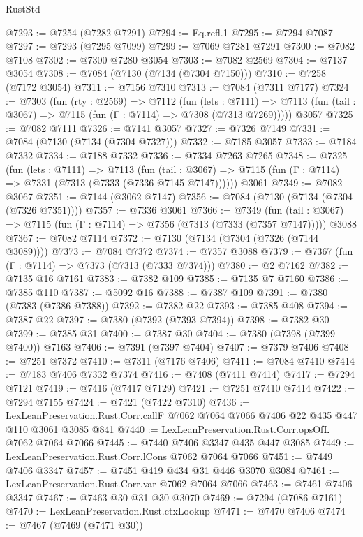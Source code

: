 \begin{lexlean}{RustStd}
\begin{coremodule}
@7293 := @7254 (@7282 @7291)
@7294 := Eq.refl.{1}
@7295 := @7294 @7087
@7297 := @7293 (@7295 @7099)
@7299 := @7069 @7281 @7291
@7300 := @7082 @7108
@7302 := @7300 @7280 @3054
@7303 := @7082 @2569
@7304 := @7137 @3054
@7308 := @7084 (@7130 (@7134 (@7304 @7150)))
@7310 := @7258 (@7172 @3054)
@7311 := @7156 @7310
@7313 := @7084 (@7311 @7177)
@7324 := @7303
    (fun (rty : @2569) =>
    @7112
      (fun (lets : @7111) =>
      @7113 (fun (tail : @3067) => @7115 (fun (Γ : @7114) => @7308 (@7313 @7269)))))
    @3057
@7325 := @7082 @7111
@7326 := @7141 @3057
@7327 := @7326 @7149
@7331 := @7084 (@7130 (@7134 (@7304 @7327)))
@7332 := @7185 @3057
@7333 := @7184 @7332
@7334 := @7188 @7332
@7336 := @7334 @7263 @7265
@7348 := @7325
    (fun (lets : @7111) =>
    @7113
      (fun (tail : @3067) => @7115 (fun (Γ : @7114) => @7331 (@7313 (@7333 (@7336 @7145 @7147))))))
    @3061
@7349 := @7082 @3067
@7351 := @7144 (@3062 @7147)
@7356 := @7084 (@7130 (@7134 (@7304 (@7326 @7351))))
@7357 := @7336 @3061
@7366 := @7349
    (fun (tail : @3067) => @7115 (fun (Γ : @7114) => @7356 (@7313 (@7333 (@7357 @7147)))))
    @3088
@7367 := @7082 @7114
@7372 := @7130 (@7134 (@7304 (@7326 (@7144 @3089))))
@7373 := @7084 @7372
@7374 := @7357 @3088
@7379 := @7367 (fun (Γ : @7114) => @7373 (@7313 (@7333 @7374)))
@7380 := @2 @7162
@7382 := @7135 @16 @7161
@7383 := @7382 @109
@7385 := @7135 @7 @7160
@7386 := @7385 @110
@7387 := @5092 @16
@7388 := @7387 @109
@7391 := @7380 (@7383 (@7386 @7388))
@7392 := @7382 @22
@7393 := @7385 @408
@7394 := @7387 @22
@7397 := @7380 (@7392 (@7393 @7394))
@7398 := @7382 @30
@7399 := @7385 @31
@7400 := @7387 @30
@7404 := @7380 (@7398 (@7399 @7400)) @7163
@7406 := @7391 (@7397 @7404)
@7407 := @7379 @7406
@7408 := @7251 @7372
@7410 := @7311 (@7176 @7406)
@7411 := @7084 @7410
@7414 := @7183 @7406 @7332 @7374
@7416 := @7408 (@7411 @7414)
@7417 := @7294 @7121
@7419 := @7416 (@7417 @7129)
@7421 := @7251 @7410 @7414
@7422 := @7294 @7155
@7424 := @7421 (@7422 @7310)
@7436 := LexLeanPreservation.Rust.Corr.callF
    @7062
    @7064
    @7066
    @7406
    @22
    @435
    @447
    @110
    @3061
    @3085
    @841
@7440 := LexLeanPreservation.Rust.Corr.opsOfL @7062 @7064 @7066
@7445 := @7440 @7406 @3347 @435 @447 @3085
@7449 := LexLeanPreservation.Rust.Corr.lCons @7062 @7064 @7066
@7451 := @7449 @7406 @3347
@7457 := @7451 @419 @434 @31 @446 @3070 @3084
@7461 := LexLeanPreservation.Rust.Corr.var @7062 @7064 @7066
@7463 := @7461 @7406 @3347
@7467 := @7463 @30 @31 @30 @3070
@7469 := @7294 (@7086 @7161)
@7470 := LexLeanPreservation.Rust.ctxLookup
@7471 := @7470 @7406
@7474 := @7467 (@7469 (@7471 @30))

\end{coremodule}
\end{lexlean}
